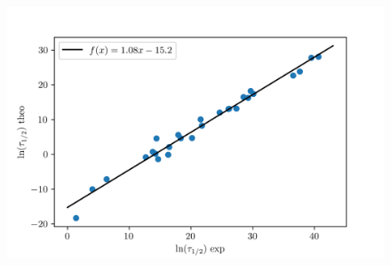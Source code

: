 \documentclass[10pt]{beamer}
\begin{document}
\begin{frame}{\insertsubsection}
    \begin{figure}
        \centering
        \includegraphics[width=1\textwidth]{Modele_vs_exp.png}
    \end{figure}
\end{frame}
\end{document}
